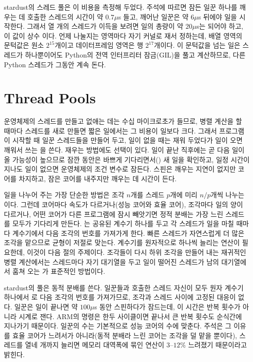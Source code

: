 \begin{instardust}
stardust의 스레드 풀은 이 비용을 측정해 두었다. 주석에 따르면 잠든 일꾼 하나를 깨우는 데 호출한 스레드의 시간이 약 $0.7\mu$s 들고, 깨어난 일꾼은 약 $6\mu$s 뒤에야 일을 시작한다. 그래서 열 개의 스레드가 이득을 보려면 일의 총량이 약 $20\mu$s는 되어야 하고, 이 값이 상수 이다. 언제 나눌지는 영역마다 자기 커널로 재서 정하는데, 배열 영역의 문턱값은 원소 $2^{15}$개이고 데이터프레임 영역은 행 $2^{17}$개이다. 이 문턱값을 넘는 일은 스레드가 하나뿐이어도 Python의 전역 인터프리터 잠금(GIL)을 풀고 계산하므로, 다른 Python 스레드가 그동안 계속 돈다.
\end{instardust}

\section{Thread Pools}
\label{sec:thread-pool}

운영체제의 스레드를 만들고 없애는 데는 수십 마이크로초가 들므로, 병렬 계산을 할 때마다 스레드를 새로 만들면 짧은 일에서는 그 비용이 일보다 크다. 그래서 프로그램이 시작할 때 일꾼 스레드들을 만들어 두고, 일이 없을 때는 재워 두었다가 일이 오면 깨워서 쓰는 을 쓴다. 재우는 방법에도 선택이 있다. 일이 끝난 직후에는 곧 다음 일이 올 가능성이 높으므로 잠깐 동안은 바쁘게 기다리면서() 새 일을 확인하고, 일정 시간이 지나도 일이 없으면 운영체제의 조건 변수로 잠든다. 스핀은 깨우는 지연이 없지만 코어를 차지하고, 잠은 코어를 내주지만 깨우는 데 시간이 든다.

일을 나누어 주는 가장 단순한 방법은 조각 $n$개를 스레드 $p$개에 미리 $n/p$개씩 나누는 이다. 그런데 코어마다 속도가 다르거나(성능 코어와 효율 코어), 조각마다 일의 양이 다르거나, 어떤 코어가 다른 프로그램에 잠시 빼앗기면 정적 분배는 가장 느린 스레드를 모두가 기다리게 만든다. 는 공유된 계수기 하나를 두고 각 스레드가 일을 마칠 때마다 계수기에서 다음 조각의 번호를 가져가게 한다. 빠른 스레드가 자연스럽게 더 많은 조각을 맡으므로 균형이 저절로 맞는다. 계수기를 원자적으로 하나씩 늘리는 연산이 필요한데, 이것이 다음 절의 주제이다. 조각들이 다시 하위 조각을 만들어 내는 재귀적인 병렬 계산에서는 스레드마다 자기 대기열을 두고 일이 떨어진 스레드가 남의 대기열에서 훔쳐 오는 가 표준적인 방법이다\cite{blumofe1999}.

\begin{instardust}
stardust의 풀은 동적 분배를 쓴다. 일꾼들과 호출한 스레드 자신이 모두 원자 계수기 하나에서 로 다음 조각의 번호를 가져가므로, 조각과 스레드 사이에 고정된 대응이 없다. 일꾼은 일이 끝나면 약 $100\mu$s 동안 스핀하다가 잠드는데, 이 시간은 반복 횟수가 아니라 시계로 잰다. ARM의  명령은 한두 사이클이면 끝나서 큰 반복 횟수도 순식간에 지나가기 때문이다. 일꾼의 수는 기본적으로 성능 코어의 수에 맞춘다. 주석은 그 이유를 효율 코어가 느려서가 아니라(동적 분배라 느린 코어는 조각을 덜 맡을 뿐이다), 스레드를 열네 개까지 늘리면 메모리 대역폭에 묶인 연산이 $3$--$12\%$ 느려졌기 때문이라고 밝힌다.
\end{instardust}

